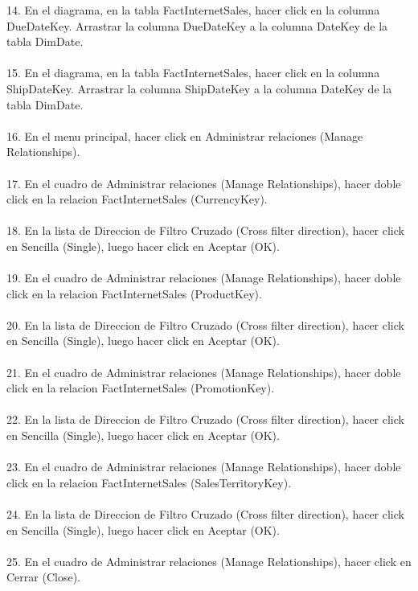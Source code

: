 \documentclass[12pt,letterpaper]{article}
\begin{document}
14. En el diagrama, en la tabla FactInternetSales, hacer click en la columna DueDateKey. Arrastrar la columna
DueDateKey a la columna DateKey de la tabla DimDate.\\\\ 
15. En el diagrama, en la tabla FactInternetSales, hacer click en la columna ShipDateKey. Arrastrar la
columna ShipDateKey a la columna DateKey de la tabla DimDate.\\\\ 
16. En el menu principal, hacer click en Administrar relaciones (Manage Relationships).\\\\ 
17. En el cuadro de Administrar relaciones (Manage Relationships), hacer doble click en la relacion
FactInternetSales (CurrencyKey).\\\\ 
18. En la lista de Direccion de Filtro Cruzado (Cross filter direction), hacer click en Sencilla (Single), luego
hacer click en Aceptar (OK).\\\\ 
19. En el cuadro de Administrar relaciones (Manage Relationships), hacer doble click en la relacion
FactInternetSales (ProductKey).\\\\ 
20. En la lista de Direccion de Filtro Cruzado (Cross filter direction), hacer click en Sencilla (Single), luego
hacer click en Aceptar (OK).\\\\ 
21. En el cuadro de Administrar relaciones (Manage Relationships), hacer doble click en la relacion
FactInternetSales (PromotionKey).\\\\ 
22. En la lista de Direccion de Filtro Cruzado (Cross filter direction), hacer click en Sencilla (Single), luego
hacer click en Aceptar (OK).\\\\ 
23. En el cuadro de Administrar relaciones (Manage Relationships), hacer doble click en la relacion
FactInternetSales (SalesTerritoryKey).\\\\ 
24. En la lista de Direccion de Filtro Cruzado (Cross filter direction), hacer click en Sencilla (Single), luego
hacer click en Aceptar (OK).\\\\ 
25. En el cuadro de Administrar relaciones (Manage Relationships), hacer click en Cerrar (Close).\\\\ 
\end{document}
